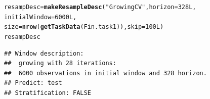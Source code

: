 \documentclass{article}\usepackage[]{graphicx}\usepackage[]{color}
\makeatletter
\newcommand{\hlnum}[1]{\textcolor[rgb]{0.686,0.059,0.569}{#1}}%
\newcommand{\hlstr}[1]{\textcolor[rgb]{0.192,0.494,0.8}{#1}}%
\newcommand{\hlstd}[1]{\textcolor[rgb]{0.345,0.345,0.345}{#1}}%
\newcommand{\hlkwb}[1]{\textcolor[rgb]{0.69,0.353,0.396}{#1}}%
\newcommand{\hlkwc}[1]{\textcolor[rgb]{0.333,0.667,0.333}{#1}}%
\newcommand{\hlkwd}[1]{\textcolor[rgb]{0.737,0.353,0.396}{\textbf{#1}}}%
\newenvironment{kframe}{%
 \def\at@end@of@kframe{}%
 \ifinner\ifhmode%
  \def\at@end@of@kframe{\end{minipage}}%
  \begin{minipage}{\columnwidth}%
 \fi\fi%
 \def\FrameCommand##1{\hskip\@totalleftmargin \hskip-\fboxsep
 \colorbox{shadecolor}{##1}\hskip-\fboxsep
     \hskip-\linewidth \hskip-\@totalleftmargin \hskip\columnwidth}%
 \MakeFramed {\advance\hsize-\width
   \@totalleftmargin\z@ \linewidth\hsize
   \@setminipage}}%
 {\par\unskip\endMakeFramed%
 \at@end@of@kframe}
\newenvironment{knitrout}{}{} %
\theoremstyle{definition}
\makeatother
\begin{document}
\begin{knitrout}
\color{fgcolor}\begin{kframe}
\begin{alltt}
\hlstd{resampDesc} \hlkwb{=} \hlkwd{makeResampleDesc}\hlstd{(}\hlstr{"GrowingCV"}\hlstd{,} \hlkwc{horizon} \hlstd{=} \hlnum{328L}\hlstd{,}
                               \hlkwc{initialWindow} \hlstd{=} \hlnum{6000L}\hlstd{,}
                               \hlkwc{size} \hlstd{=} \hlkwd{nrow}\hlstd{(}\hlkwd{getTaskData}\hlstd{(Fin.task1)),} \hlkwc{skip} \hlstd{=} \hlnum{100L}\hlstd{)}
\hlstd{resampDesc}
\end{alltt}
\begin{verbatim}
## Window description:
##  growing with 28 iterations:
##  6000 observations in initial window and 328 horizon.
## Predict: test
## Stratification: FALSE
\end{verbatim}
\end{kframe}
\end{knitrout}
\end{document}
